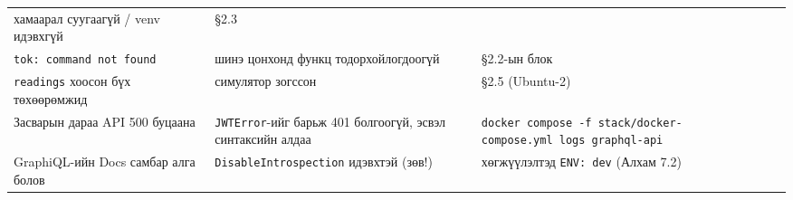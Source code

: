\begin{longtable}[]{@{}lll@{}}
\begin{minipage}[t]{0.30\columnwidth}
хамаарал суугаагүй / venv идэвхгүй\strut
\end{minipage} & \begin{minipage}[t]{0.30\columnwidth}\raggedright
§2.3\strut
\end{minipage}\tabularnewline
\begin{minipage}[t]{0.30\columnwidth}\raggedright
\texttt{tok:\allowbreak{}\ command\ not\ found}\strut
\end{minipage} & \begin{minipage}[t]{0.30\columnwidth}\raggedright
шинэ цонхонд функц тодорхойлогдоогүй\strut
\end{minipage} & \begin{minipage}[t]{0.30\columnwidth}\raggedright
§2.2-ын блок\strut
\end{minipage}\tabularnewline
\begin{minipage}[t]{0.30\columnwidth}\raggedright
\texttt{readings} хоосон бүх төхөөрөмжид\strut
\end{minipage} & \begin{minipage}[t]{0.30\columnwidth}\raggedright
симулятор зогссон\strut
\end{minipage} & \begin{minipage}[t]{0.30\columnwidth}\raggedright
§2.5 (Ubuntu-2)\strut
\end{minipage}\tabularnewline
\begin{minipage}[t]{0.30\columnwidth}\raggedright
Засварын дараа API 500 буцаана\strut
\end{minipage} & \begin{minipage}[t]{0.30\columnwidth}\raggedright
\texttt{JWTError}-ийг барьж 401 болгоогүй, эсвэл синтаксийн алдаа\strut
\end{minipage} & \begin{minipage}[t]{0.30\columnwidth}\raggedright
\texttt{docker\ compose\ -f\ stack/\allowbreak{}docker-compose.\allowbreak{}yml\ logs\ graphql-api}\strut
\end{minipage}\tabularnewline
\begin{minipage}[t]{0.30\columnwidth}\raggedright
GraphiQL-ийн Docs самбар алга болов\strut
\end{minipage} & \begin{minipage}[t]{0.30\columnwidth}\raggedright
\texttt{DisableIntrospection} идэвхтэй (зөв!)\strut
\end{minipage} & \begin{minipage}[t]{0.30\columnwidth}\raggedright
хөгжүүлэлтэд \texttt{ENV:\ dev} (Алхам 7.2)\strut
\end{minipage}\tabularnewline

\end{longtable}
